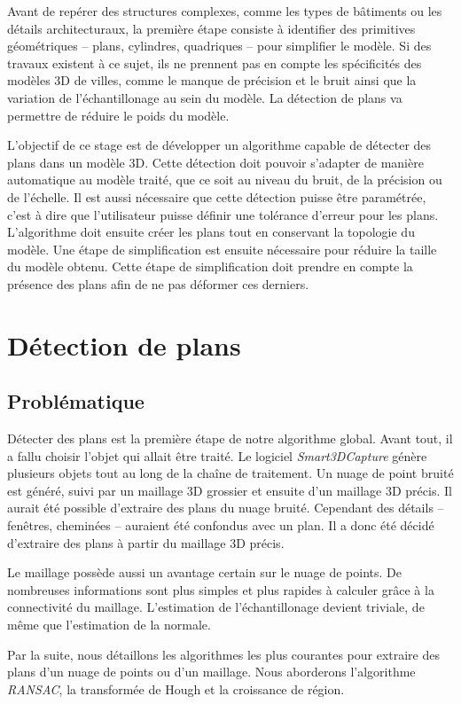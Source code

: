 ﻿\documentclass[12pt, twoside]{article}
\let\oldsection\section
\def\section{\cleardoublepage\oldsection}
\begin{document}
Avant de repérer des structures complexes, comme les types de bâtiments ou les détails architecturaux, la première étape consiste à identifier des primitives géométriques -- plans, cylindres, quadriques -- pour simplifier le modèle. Si des travaux existent à ce sujet, ils ne prennent pas en compte les spécificités des modèles 3D de villes, comme le manque de précision et le bruit ainsi que la variation de l'échantillonage au sein du modèle. La détection de plans va permettre de réduire le poids du modèle.

L'objectif de ce stage est de développer un algorithme capable de détecter des plans dans un modèle 3D. Cette détection doit pouvoir s'adapter de manière automatique au modèle traité, que ce soit au niveau du bruit, de la précision ou de l'échelle. Il est aussi nécessaire que cette détection puisse être paramétrée, c'est à dire que l'utilisateur puisse définir une tolérance d'erreur pour les plans. L'algorithme doit ensuite créer les plans tout en conservant la topologie du modèle. Une étape de simplification est ensuite nécessaire pour réduire la taille du modèle obtenu. Cette étape de simplification doit prendre en compte la présence des plans afin de ne pas déformer ces derniers.
\newpage

\section{Détection de plans}
\subsection{Problématique}
Détecter des plans est la première étape de notre algorithme global. Avant tout, il a fallu choisir l'objet qui allait être traité. Le logiciel \textit{Smart3DCapture} génère plusieurs objets tout au long de la chaîne de traitement. Un nuage de point bruité est généré, suivi par un maillage 3D grossier et ensuite d'un maillage 3D précis. Il aurait été possible d'extraire des plans du nuage bruité. Cependant des détails -- fenêtres, cheminées -- auraient été confondus avec un plan. Il a donc été décidé d'extraire des plans à partir du maillage 3D précis.

Le maillage possède aussi un avantage certain sur le nuage de points. De nombreuses informations sont plus simples et plus rapides à calculer grâce à la connectivité du maillage. L'estimation de l'échantillonage devient triviale, de même que l'estimation de la normale.

Par la suite, nous détaillons les algorithmes les plus courantes pour extraire des plans d'un nuage de points ou d'un maillage. Nous aborderons l'algorithme \textit{RANSAC}, la transformée de Hough et la croissance de région.
\end{document}
